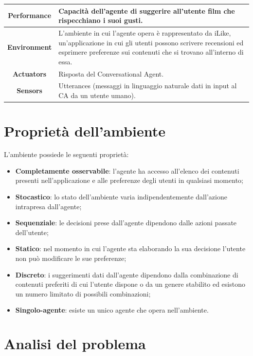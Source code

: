 \documentclass[a4paper, 10pt]{report}
\begin{document}
    \begin{tabular}{|c|p{8cm}|}
        \hline
        \textbf{Performance} & Capacità dell’agente di suggerire all’utente film che rispecchiano i suoi gusti. \\
        \hline
        \textbf{Environment} & L’ambiente in cui l’agente opera è rappresentato da iLike, un’applicazione in cui gli
        utenti possono scrivere recensioni ed esprimere preferenze sui contenuti che si trovano all’interno di essa.\\
        \hline
        \textbf{Actuators} & Risposta del Conversational Agent.\\
        \hline
        \textbf{Sensors} & Utterances (messaggi in linguaggio naturale dati in input al CA da un utente umano).\\
        \hline
    \end{tabular}

    \section{Proprietà dell'ambiente}\label{sec:proprieta-dell'ambiente}
    L’ambiente possiede le seguenti proprietà:
    \begin{itemize}
        \item \textbf{Completamente osservabile}: l’agente ha accesso all’elenco dei contenuti presenti nell’applicazione
        e alle preferenze degli utenti in qualsiasi momento;
        \item \textbf{Stocastico}: lo stato dell’ambiente varia indipendentemente dall’azione intrapresa dall’agente;
        \item \textbf{Sequenziale}: le decisioni prese dall’agente dipendono dalle azioni passate dell’utente;
        \item \textbf{Statico}: nel momento in cui l’agente sta elaborando la sua decisione l’utente non può modificare
        le sue preferenze;
        \item \textbf{Discreto}: i suggerimenti dati dall’agente dipendono dalla combinazione di contenuti preferiti di cui
        l’utente dispone o da un genere stabilito ed esistono un numero limitato di possibili combinazioni;
        \item \textbf{Singolo-agente}: esiste un unico agente che opera nell’ambiente.
    \end{itemize}

    \section{Analisi del problema}\label{sec:analisi-del-problema}
\end{document}
